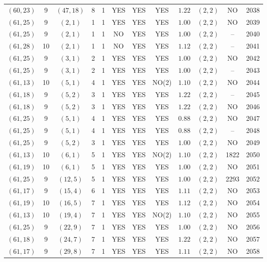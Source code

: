 \begin{longtable}{|c|c|c|c|c|c|c|c|c|c|c|c|}
$(60,23)$ & 9 & $(47,18)$ & 8 & 1 & YES & YES & YES & $1.22$ & $(2,2)$ & NO & 2038\\
$(61,25)$ & 9 & $(2,1)$ & 1 & 1 & YES & YES & YES & $1.00$ & $(2,2)$ & NO & 2039\\
$(61,25)$ & 9 & $(2,1)$ & 1 & 1 & NO & YES & YES & $1.00$ & $(2,2)$ & -- & 2040\\
$(61,28)$ & 10 & $(2,1)$ & 1 & 1 & NO & YES & YES & $1.12$ & $(2,2)$ & -- & 2041\\
$(61,25)$ & 9 & $(3,1)$ & 2 & 1 & YES & YES & YES & $1.00$ & $(2,2)$ & NO & 2042\\
$(61,25)$ & 9 & $(3,1)$ & 2 & 1 & YES & YES & YES & $1.00$ & $(2,2)$ & -- & 2043\\
$(61,13)$ & 10 & $(5,1)$ & 4 & 1 & YES & YES & NO(2) & $1.10$ & $(2,2)$ & NO & 2044\\
$(61,18)$ & 9 & $(5,2)$ & 3 & 1 & YES & YES & YES & $1.22$ & $(2,2)$ & -- & 2045\\
$(61,18)$ & 9 & $(5,2)$ & 3 & 1 & YES & YES & YES & $1.22$ & $(2,2)$ & NO & 2046\\
$(61,25)$ & 9 & $(5,1)$ & 4 & 1 & YES & YES & YES & $0.88$ & $(2,2)$ & NO & 2047\\
$(61,25)$ & 9 & $(5,1)$ & 4 & 1 & YES & YES & YES & $0.88$ & $(2,2)$ & -- & 2048\\
$(61,25)$ & 9 & $(5,2)$ & 3 & 1 & YES & YES & YES & $1.00$ & $(2,2)$ & NO & 2049\\
$(61,13)$ & 10 & $(6,1)$ & 5 & 1 & YES & YES & NO(2) & $1.10$ & $(2,2)$ & 1822 & 2050\\
$(61,19)$ & 10 & $(6,1)$ & 5 & 1 & YES & YES & YES & $1.00$ & $(2,2)$ & NO & 2051\\
$(61,25)$ & 9 & $(12,5)$ & 5 & 1 & YES & YES & YES & $1.00$ & $(2,2)$ & 2293 & 2052\\
$(61,17)$ & 9 & $(15,4)$ & 6 & 1 & YES & YES & YES & $1.11$ & $(2,2)$ & NO & 2053\\
$(61,19)$ & 10 & $(16,5)$ & 7 & 1 & YES & YES & YES & $1.12$ & $(2,2)$ & NO & 2054\\
$(61,13)$ & 10 & $(19,4)$ & 7 & 1 & YES & YES & NO(2) & $1.10$ & $(2,2)$ & NO & 2055\\
$(61,25)$ & 9 & $(22,9)$ & 7 & 1 & YES & YES & YES & $1.00$ & $(2,2)$ & NO & 2056\\
$(61,18)$ & 9 & $(24,7)$ & 7 & 1 & YES & YES & YES & $1.22$ & $(2,2)$ & NO & 2057\\
$(61,17)$ & 9 & $(29,8)$ & 7 & 1 & YES & YES & YES & $1.11$ & $(2,2)$ & NO & 2058\\

\end{longtable}
